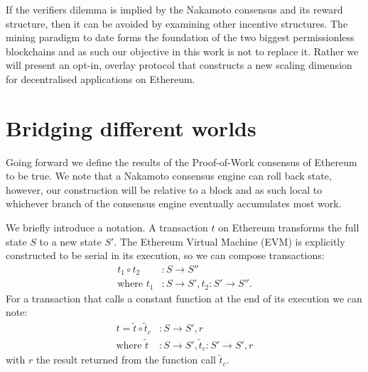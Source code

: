 \documentclass[twocolumn]{article}
\begin{document}
If the verifiers dilemma is implied by the Nakamoto consensus and its reward structure, then it can be avoided by examining other incentive structures.  The mining paradigm to date forms the foundation of the two biggest permissionless blockchains %
and as such our objective in this work is not to replace it.  Rather we will present an opt-in, overlay protocol that constructs a new scaling dimension for decentralised applications on Ethereum.


\section{Bridging different worlds}

Going forward we define the results of the Proof-of-Work consensus of Ethereum to be true.  We note that a Nakamoto consensus engine can roll back state, however, our construction will be relative to a block and as such local to whichever branch of the consensus engine eventually accumulates most work.

We briefly introduce a notation. A transaction $t$ on Ethereum transforms the full state $S$ to a new state $S'$.  The Ethereum Virtual Machine (EVM) is explicitly constructed to be serial in its execution, so we can compose transactions:
\begin{align}
	t_1 \circ t_2&: S \rightarrow S'' \\
	\text{where } t_1&: S \rightarrow S',
	t_2: S' \rightarrow S''. \nonumber
\end{align}
For a transaction that calls a constant function at the end of its execution we can note:
\begin{align}
	t = \tilde{t} \circ \tilde{t}_c&: S \rightarrow S', r \\
	\text{where } \tilde{t}&: S \rightarrow S', \tilde{t}_c: S' \rightarrow S', r \nonumber
\end{align}
with $r$ the result returned from the function call $\tilde{t}_c$.
\end{document}
